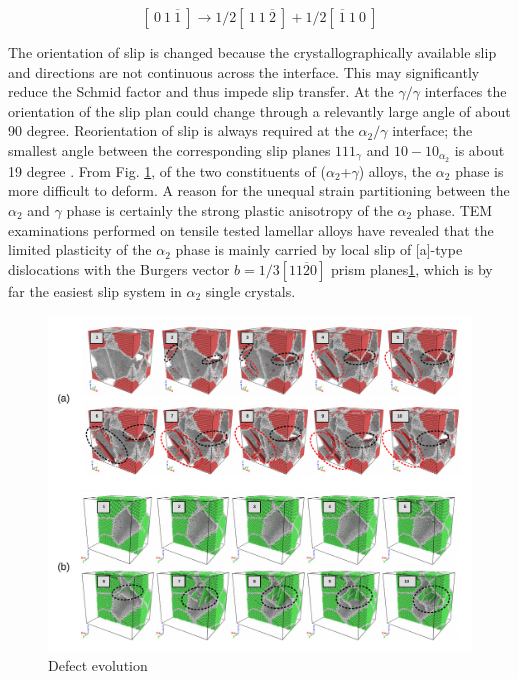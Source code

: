 \documentclass[materials,article,submit,moreauthors,pdftex,10pt,a4paper]{Definitions/mdpi}
\begin{document}
\begin{equation}\label{eq:dis1}
	[\ 0\ 1\ \overline{1}\ ] \to 1/2 [\ 1\ 1\ \overline{2}\ ]+1/2[\ \overline{1}\ 1\ 0\ ]
\end{equation}

The orientation of slip is changed because the crystallographically available slip and directions are not continuous across the interface. This may significantly reduce the Schmid factor and thus impede slip transfer. At the $\gamma/\gamma$ interfaces the orientation of the slip plan could change through a relevantly large angle of about 90 degree. Reorientation of slip is always required at the $\alpha_{2}/\gamma$ interface; the smallest angle between the corresponding slip planes ${1 1 1}_{\gamma}$ and ${ 1 0 -1 0}_{\alpha_2}$ is about 19 degree \cite{}. From Fig. \ref{fig:Defect}, of the two constituents of ($\alpha_2$+$\gamma$) alloys, the $\alpha_2$ phase is more difficult to deform. A reason for the unequal strain partitioning between the $\alpha_2$ and $\gamma$ phase is certainly the strong plastic anisotropy of the $\alpha_2$ phase. TEM examinations performed on tensile tested lamellar alloys have revealed that the limited plasticity of the $\alpha_2$ phase is mainly carried by local slip of [a]-type dislocations with the Burgers vector $b=1/3[11\overline{2}0]$ prism planes\ref{fig:Defect}, which is by far the easiest slip system in $\alpha_2$ single crystals. 
 

\begin{figure}[ht] 
	\centering
	\includegraphics[width=1\linewidth]{img/def}
	\caption{Defect evolution}
	\label{fig:Defect}
\end{figure}
\end{document}
